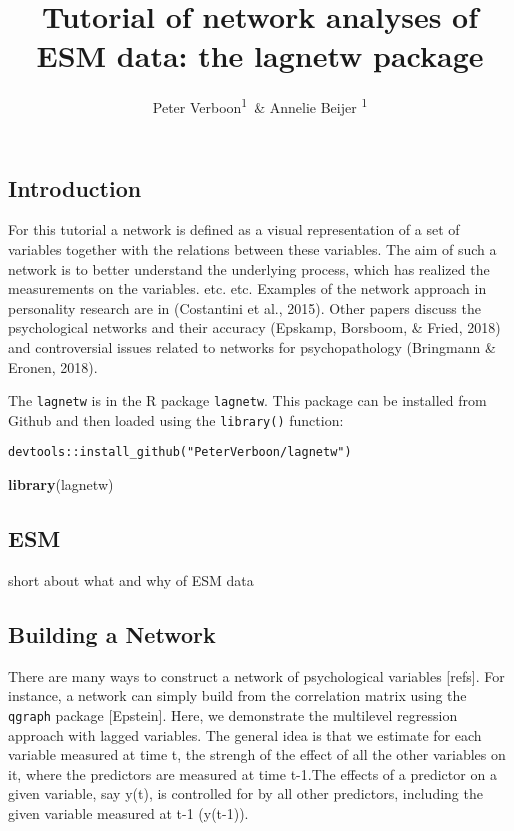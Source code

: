 \documentclass[man,floatsintext]{apa6}
\title{Tutorial of network analyses of ESM data: the lagnetw package}
\author{Peter Verboon\textsuperscript{1}~\& Annelie Beijer \textsuperscript{1 }}
\date{}
\affiliation{
\vspace{0.5cm}
\textsuperscript{1} Open University}
\newenvironment{Shaded}{\begin{snugshade}}{\end{snugshade}}
\newcommand{\KeywordTok}[1]{\textcolor[rgb]{0.13,0.29,0.53}{\textbf{#1}}}
\newcommand{\NormalTok}[1]{#1}
\theoremstyle{definition}
\theoremstyle{definition}
\theoremstyle{definition}
\theoremstyle{remark}
\begin{document}
\maketitle

\subsection{Introduction}\label{introduction}

For this tutorial a network is defined as a visual representation of a
set of variables together with the relations between these variables.
The aim of such a network is to better understand the underlying
process, which has realized the measurements on the variables. etc. etc.
Examples of the network approach in personality research are in
(Costantini et al., 2015). Other papers discuss the psychological
networks and their accuracy (Epskamp, Borsboom, \& Fried, 2018) and
controversial issues related to networks for psychopathology (Bringmann
\& Eronen, 2018).

The \texttt{lagnetw} is in the R package \texttt{lagnetw}. This package
can be installed from Github and then loaded using the
\texttt{library()} function:

\texttt{devtools::install\_github("PeterVerboon/lagnetw")}

\begin{Shaded}
\begin{Highlighting}[]
\KeywordTok{library}\NormalTok{(lagnetw)}
\end{Highlighting}
\end{Shaded}

\subsection{ESM}\label{esm}

short about what and why of ESM data

\subsection{Building a Network}\label{building-a-network}

There are many ways to construct a network of psychological variables
{[}refs{]}. For instance, a network can simply build from the
correlation matrix using the \texttt{qgraph} package {[}Epstein{]}.
Here, we demonstrate the multilevel regression approach with lagged
variables. The general idea is that we estimate for each variable
measured at time t, the strengh of the effect of all the other variables
on it, where the predictors are measured at time t-1.The effects of a
predictor on a given variable, say y(t), is controlled for by all other
predictors, including the given variable measured at t-1 (y(t-1)).
\end{document}
